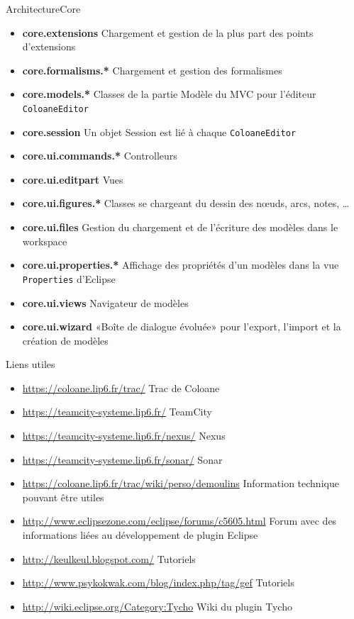 \documentclass{beamer}
\begin{document}
\begin{frame}{Architecture}{Core}
\footnotesize
\begin{itemize}
\item \textbf{core.extensions} Chargement et gestion de la plus part des points d'extensions
\item \textbf{core.formalisms.*} Chargement et gestion des formalismes
\item \textbf{core.models.*} Classes de la partie Modèle du MVC pour l'éditeur \texttt{ColoaneEditor}
\item \textbf{core.session} Un objet Session est lié à chaque \texttt{ColoaneEditor}
\item \textbf{core.ui.commands.*} Controlleurs
\item \textbf{core.ui.editpart} Vues
\item \textbf{core.ui.figures.*} Classes se chargeant du dessin des nœuds, arcs, notes, …
\item \textbf{core.ui.files} Gestion du chargement et de l'écriture des modèles dans le workspace
\item \textbf{core.ui.properties.*} Affichage des propriétés d'un modèles dans la vue \texttt{Properties} d'Eclipse
\item \textbf{core.ui.views} Navigateur de modèles
\item \textbf{core.ui.wizard} «Boîte de dialogue évoluée» pour l'export, l'import et la création de modèles
\end{itemize}
\end{frame}



\begin{frame}{Liens utiles}
\begin{itemize}
\item \url{https://coloane.lip6.fr/trac/} Trac de Coloane
\item \url{https://teamcity-systeme.lip6.fr/} TeamCity
\item \url{https://teamcity-systeme.lip6.fr/nexus/} Nexus
\item \url{https://teamcity-systeme.lip6.fr/sonar/} Sonar
\item \url{https://coloane.lip6.fr/trac/wiki/perso/demoulins} Information technique pouvant être utiles
\item \url{http://www.eclipsezone.com/eclipse/forums/c5605.html} Forum avec des informations liées au développement de plugin Eclipse
\item \url{http://keulkeul.blogspot.com/} Tutoriels
\item \url{http://www.psykokwak.com/blog/index.php/tag/gef} Tutoriels
\item \url{http://wiki.eclipse.org/Category:Tycho} Wiki du plugin Tycho
\end{itemize}
\end{frame}
\end{document}
